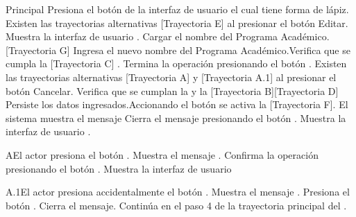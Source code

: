 \begin{UCtrayectoria}{Principal}
    \UCpaso[\UCactor] Presiona el botón  de la interfaz de usuario  el cual tiene forma de lápiz. Existen las trayectorias alternativas [Trayectoria E] al presionar el botón Editar.
    \UCpaso Muestra la interfaz de usuario .
    \UCpaso Cargar el nombre del Programa Académico.[Trayectoria G]
    \UCpaso[\UCactor] Ingresa el nuevo nombre del Programa Académico.Verifica que se cumpla la [Trayectoria C] .
    \UCpaso[\UCactor] Termina la operación presionando el botón . Existen las trayectorias alternativas [Trayectoria A] y [Trayectoria A.1] al presionar el botón Cancelar.
    \UCpaso Verifica que se cumplan la  y la  [Trayectoria B][Trayectoria D]
    \UCpaso Persiste los datos ingresados.Accionando el botón  se activa la  [Trayectoria F].
    \UCpaso El sistema muestra el mensaje 
    \UCpaso[\UCactor] Cierra el mensaje presionando el botón .
    \UCpaso Muestra la interfaz de usuario .
\end{UCtrayectoria}


\begin{UCtrayectoriaA}{A}{El actor presiona el botón .}
    \UCpaso Muestra el mensaje .
    \UCpaso[\UCactor] Confirma la operación presionando el botón .
    \UCpaso Muestra la interfaz de usuario 
\end{UCtrayectoriaA}


\begin{UCtrayectoriaA}{A.1}{El actor presiona accidentalmente el botón .}
    \UCpaso Muestra el mensaje .
    \UCpaso[\UCactor] Presiona el botón .
    \UCpaso Cierra el mensaje.
    \UCpaso Continúa en el paso 4 de la trayectoria principal del .
\end{UCtrayectoriaA}

